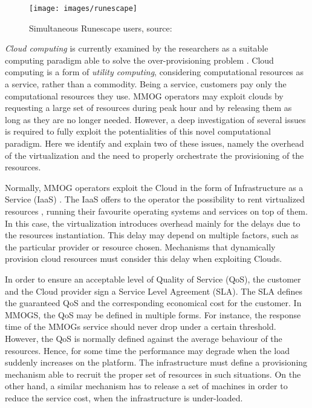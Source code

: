 \documentclass[final,10pt,a5paper]{phdimt}
\theoremstyle{definition}
\begin{document}
\begin{figure}[tbh]
\centering
\texttt{[image: images/runescape]}
\caption{Simultaneous Runescape users, source: \cite{Marzolla}}
\label{fig:runescape}
\end{figure}

\textit{Cloud computing} is currently examined by the researchers as a suitable computing paradigm able to solve the over-provisioning problem \cite{carlini2010integration, IosupTPDS, Marzolla}.
Cloud computing is a form of \textit{utility computing}, considering computational resources as a service, rather than a commodity. Being a service, customers pay only the computational resources they use.
MMOG operators may exploit clouds by requesting a large set of resources during peak hour and by releasing  them as long as they are no longer needed. However, a deep investigation of several issues is required to fully exploit the potentialities of this novel computational paradigm.  Here we identify and explain two of these issues, namely the overhead of the virtualization and the need to properly orchestrate the provisioning of the resources.

Normally, MMOG operators exploit the Cloud in the form of Infrastructure as a Service (IaaS) \cite{bhardwaj2010cloud}. 
The IaaS offers to the operator the possibility to rent virtualized resources , running their favourite operating systems and services on top of them. In this case, the virtualization introduces overhead mainly for the delays due to the resources instantiation. This delay may depend on multiple factors, such as the particular provider or resource chosen. Mechanisms that dynamically provision cloud resources must consider this delay when exploiting Clouds.

In order to ensure an acceptable level of Quality of Service (QoS), the customer and the Cloud provider sign
a Service Level Agreement (SLA). The SLA defines the guaranteed QoS and the corresponding economical cost for the customer.
In MMOGS, the QoS may be defined in multiple forms. For instance, the response time of the MMOGs service should never drop under a certain threshold. However, the QoS is normally defined against the average behaviour of the resources. Hence, for some time the performance may degrade when the load suddenly increases on the platform.
The infrastructure must define a provisioning mechanism able to recruit the proper  set of resources in such situations. 
On the other hand, a similar mechanism has to release a set of machines in order to reduce the service cost, when the infrastructure is under-loaded.
\end{document}
